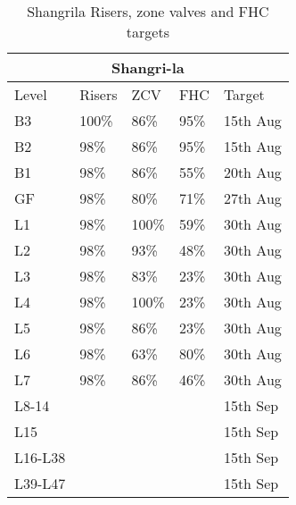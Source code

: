 \begin{table}[htbp]\label{tbl:fire2}
\begin{center}
\begin{tabular}{lllll}
\toprule
\multicolumn{5}{c}{Shangri-la}\\
\midrule
Level	&Risers &ZCV	&FHC  &Target\\
\midrule
B3	&100\% &86\%	 &95\%  &15th Aug\\
B2	&98\%	  &86\%	&95\%   &15th Aug\\
\midrule
B1	&98\%	 &86\%	&55\%  &20th Aug\\
GF	&98\%	 &80\%	&71\%  &27th Aug\\
\midrule
L1	&98\%	 &100\%	&59\%  &30th Aug\\
L2	&98\%	 &93\%	&48\%  &30th Aug\\
L3	&98\%	 &83\%	&23\%  &30th Aug\\
L4	&98\%	 &100\%	&23\%  &30th Aug\\
L5	&98\%	 &86\%	&23\%  &30th Aug\\
L6	&98\%	 &63\%	&80\%  &30th Aug\\
L7	&98\%	&86\%	&46\%              &30th Aug\\
\midrule
L8-14	&         &          &      &15th Sep\\ 	 	 
L15	&        &           &      &15th Sep\\ 	 	 
L16-L38 &      &           &      &15th Sep\\	 	 	 
L39-L47 &      &           &      &15th Sep\\	 	 	 
\bottomrule
\end{tabular}
\caption{Shangrila Risers, zone valves and FHC targets}
\end{center}
\end{table}

